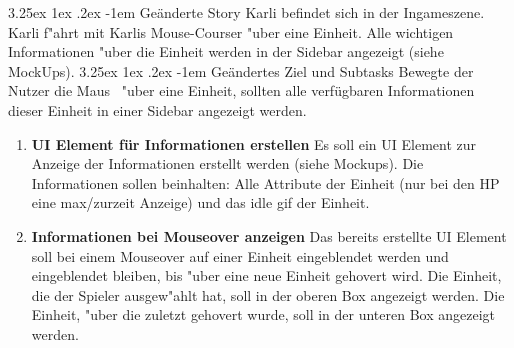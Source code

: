 \documentclass[12pt, titlepage]{scrartcl}
\makeatletter
\renewcommand\paragraph{\@startsection{paragraph}{5}{\z@}%
  {3.25ex \@plus1ex \@minus.2ex}%
  {-1em}%
  {\normalfont\normalsize\bfseries}}
\makeatother
\begin{document}
				\paragraph{Ge\"anderte Story}
					Karli befindet sich in der Ingameszene. Karli f"ahrt mit Karlis Mouse-Courser "uber eine Einheit. Alle wichtigen Informationen "uber die Einheit werden in der Sidebar angezeigt (siehe MockUps).
   				\paragraph{Ge\"andertes Ziel und Subtasks}
   					Bewegte der Nutzer die Maus \ "uber eine Einheit, sollten alle verf\"ugbaren Informationen dieser Einheit in einer Sidebar angezeigt werden.
   					\begin{enumerate}[label={}]
   						\item \textbf{UI Element f\"ur Informationen erstellen} \hspace{5pt} Es soll ein UI Element zur Anzeige der Informationen erstellt werden (siehe Mockups). Die Informationen sollen beinhalten: Alle Attribute der Einheit (nur bei den HP eine max/zurzeit Anzeige) und das idle gif der Einheit.
   						\item \textbf{Informationen bei Mouseover anzeigen} \hspace{5pt} Das bereits erstellte UI Element soll bei einem Mouseover auf einer Einheit eingeblendet werden und eingeblendet bleiben, bis "uber eine neue Einheit gehovert wird. Die Einheit, die der Spieler ausgew"ahlt hat, soll in der oberen Box angezeigt werden. Die Einheit, "uber die zuletzt gehovert wurde, soll in der unteren Box angezeigt werden.
   					\end{enumerate}
\end{document}
